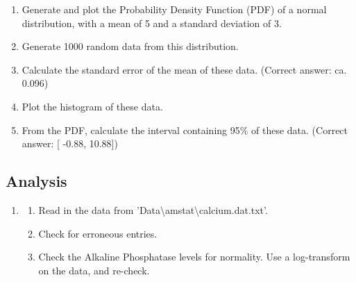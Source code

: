 \begin{enumerate}
  \item  Generate and plot the Probability Density Function (PDF) of a normal distribution, with a mean of 5 and a standard deviation of 3.
  \item  Generate 1000 random data from this distribution.
  \item  Calculate the standard error of the mean of these data.
    (Correct answer: ca. 0.096)

  \item  Plot the histogram of these data.
  \item  From the PDF, calculate the interval containing 95\% of these data.
    (Correct answer: [ -0.88, 10.88])
\end{enumerate}

\subsection*{Analysis}
\begin{enumerate}
  \item
  \begin{enumerate}
    \item Read in the data from 'Data\textbackslash amstat\textbackslash calcium.dat.txt'.
    \item Check for erroneous entries.
    \item Check the Alkaline Phosphatase levels for normality. Use a log-transform on the data, and re-check.
  \end{enumerate}

\end{enumerate}

